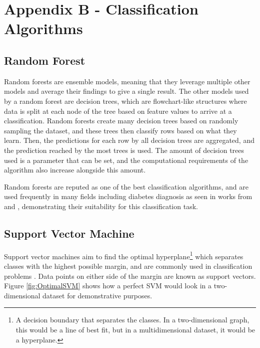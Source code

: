 \begingroup
\renewcommand\thechapter{B}
\titleformat{\chapter}[display]
{\normalfont\huge\bfseries}{}{20pt}{\Huge}
\setcounter{section}{0} %
\setcounter{figure}{0} %

\chapter*{Appendix B - Classification Algorithms}

\section{Random Forest}
Random forests are ensemble models, meaning that they leverage multiple other models and average their findings to 
give a single result. The other models used by a random forest are decision trees, which are flowchart-like structures where 
data is split at each node of the tree based on feature values to arrive at a classification. Random forests create many decision 
trees based on randomly sampling the dataset, and these trees then classify rows based on what they learn. Then, the predictions 
for each row by all decision trees are aggregated, and the prediction reached by the most trees is used.
The amount of decision trees used is a parameter that can be set, and the computational requirements of the algorithm 
also increase alongside this amount.

\para Random forests are reputed as one of the best classification algorithms, and are used frequently in many fields 
including diabetes diagnosis as seen in works from \textcite{chang_pima_2023} and \textcite{alzubi_diabetes_2023},
demonstrating their suitability for this classification task.

\section{Support Vector Machine}
Support vector machines aim to find the optimal hyperplane\footnote{A decision boundary that separates the classes. In a two-dimensional graph, this would be a line of best fit, but in a multidimensional dataset, it would be a hyperplane.}
which separates classes with the highest possible margin, and are commonly used in classification problems \autocite{ibm_what_2023}. Data points on either 
side of the margin are known as support vectors. Figure \ref{fig:OptimalSVM} shows how a perfect SVM would look in a two-dimensional dataset for demonstrative purposes.

